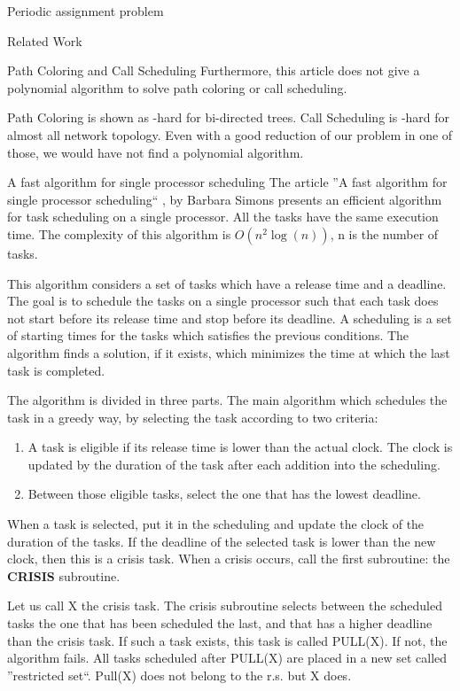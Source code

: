 \documentclass[a4paper,10pt]{report}
\begin{document}
\begin{chapter}{Periodic assignment problem}
\begin{section}{Related Work}
\begin{subsection}{Path Coloring and Call Scheduling}
Furthermore, this article does not give a polynomial algorithm to solve path coloring or call scheduling. 

Path Coloring is shown as \NP-hard for bi-directed trees. Call Scheduling is \NP-hard for almost all network topology. Even with a good reduction of our problem in one of those, we would have not find a polynomial algorithm.


\end{subsection}

\begin{subsection}{A fast algorithm for single processor scheduling}
The article ''A fast algorithm for single processor scheduling`` \cite{simons1978fast}, by Barbara Simons presents an efficient algorithm for task 
scheduling on a single processor. All the tasks have the same execution time. The complexity of this algorithm is $O(n^2\log(n))$, n is the number of tasks.

This algorithm considers a set of tasks which have a release time and a deadline. The goal is to schedule the tasks on a single processor such
that each task does not start before its release time and stop before its deadline.
A scheduling is a set of starting times for the tasks which satisfies the previous conditions.
The algorithm finds a solution, if it exists, which minimizes the time at which the last task is completed.

The algorithm is divided in three parts.
The main algorithm which schedules the task in a greedy way, by selecting the task according to two criteria:
\begin{enumerate}
 \item A task is eligible if its release time is lower than the actual clock. The clock is updated by the duration of the task after each addition into the scheduling.
 \item Between those eligible tasks, select the one that has the lowest deadline.
\end{enumerate}

When a task is selected, put it in the scheduling and update the clock of the duration of the tasks.
If the deadline of the selected task is lower than the new clock, then this is a crisis task.
When a crisis occurs, call the first subroutine: the {\bf CRISIS} subroutine.

Let us call X the crisis task.
The crisis subroutine selects between the scheduled tasks the one that has been scheduled the last, and that has a higher deadline than the crisis task.
If such a task exists, this task is called PULL(X). If not, the algorithm fails.
All tasks scheduled after PULL(X) are placed in a new set called ''restricted set``.
Pull(X) does not belong to the r.s. but X does.


\end{subsection}
\end{section}
\end{chapter}
\end{document}
